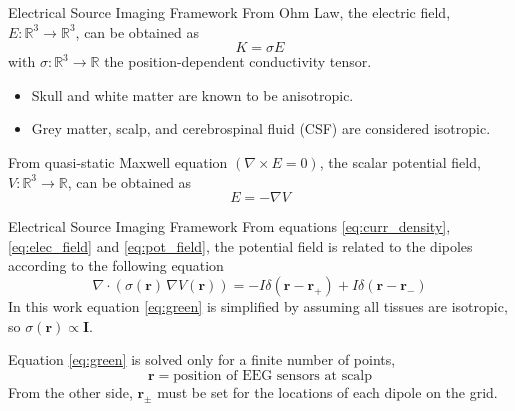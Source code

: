 \documentclass[progressbar=head]{beamer}
\newcommand{\ppar}[1]{ \left( #1 \right) }
\newcommand{\id}{\mathbf{I}}
\newcommand{\R}{\mathbb{R}}
\newcommand{\rr}{\mathbf{r}}
\begin{document}
\begin{frame}{Electrical Source Imaging Framework}
From Ohm Law, the \alert{electric field}, $E: \R^3\rightarrow \R^3$, can be obtained as
\begin{equation}
    K = \sigma E
    \label{eq:elec_field}
\end{equation}
with $\sigma: \R^3 \rightarrow \R$ the position-dependent conductivity tensor.
\begin{itemize}
    \item Skull and white matter are known to be anisotropic.
    \item Grey matter, scalp, and cerebrospinal fluid (CSF) are considered isotropic.
\end{itemize}

From quasi-static Maxwell equation $\ppar{\nabla\times E=0}$, the \alert{scalar potential field}, $V: \R^3\rightarrow \R$, can be obtained as
\begin{equation}
    E = - \nabla V
    \label{eq:pot_field}
\end{equation}
\end{frame}

\begin{frame}{Electrical Source Imaging Framework}
From equations \eqref{eq:curr_density}, \eqref{eq:elec_field} and \eqref{eq:pot_field}, the potential field is related to the dipoles according to the following equation
\begin{equation}
\nabla \cdot\ppar{\sigma(\rr)\, \nabla V(\rr) } = 
-I \delta\ppar{\rr-\rr_+} + I \delta\ppar{\rr-\rr_-}
\label{eq:green}
\end{equation}
In this work equation \eqref{eq:green} is simplified by assuming 
all tissues are isotropic, so $\sigma(\rr)\propto \id$.

Equation \eqref{eq:green} is solved 
only for a finite number of points, 
\begin{equation*}
    \rr = \text{position of EEG sensors at scalp}
\end{equation*}
From the other side, $\rr_\pm$ must be set for the locations of each dipole on the grid.
\end{frame}
\end{document}
